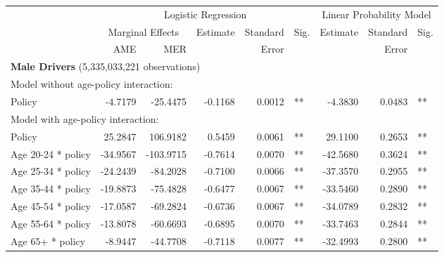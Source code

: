 
\begin{table}%
\centering 
\begin{tabular}{l r r r r l r r l} 

\hline 
 
 & \multicolumn{5}{c}{Logistic Regression}  & \multicolumn{3}{c}{Linear Probability Model} \\ 

 \cmidrule(lr){2-6}\cmidrule(lr){7-9} 
 & \multicolumn{2}{c}{Marginal Effects} & Estimate & Standard & Sig. & Estimate & Standard & Sig. \\ 

 \cmidrule(lr){2-3} 
 &   AME &  MER  &          &  Error   &      &          &  Error   &     \\ 

\hline 
 
\multicolumn{8}{l}{\textbf{Male Drivers} (5,335,033,221 observations)} \\ 

\hline
\multicolumn{8}{l}{Model without age-policy interaction: } \\ 
Policy                   &  -4.7179        &  -25.4475       &  -0.1168        &  0.0012       &   **       &  -4.3830        &  0.0483       &   **       \\ 
\hline
\multicolumn{8}{l}{Model with age-policy interaction: } \\ 
Policy                   &  25.2847        &  106.9182       &  0.5459        &  0.0061       &   **       &  29.1100        &  0.2653       &   **       \\ 
Age 20-24 * policy   &  -34.9567        &  -103.9715       &  -0.7614        &  0.0070       &   **       &  -42.5680        &  0.3624       &   **       \\ 
Age 25-34 * policy   &  -24.2439        &  -84.2028       &  -0.7100        &  0.0066       &   **       &  -37.3570        &  0.2955       &   **       \\ 
Age 35-44 * policy   &  -19.8873        &  -75.4828       &  -0.6477        &  0.0067       &   **       &  -33.5460        &  0.2890       &   **       \\ 
Age 45-54 * policy   &  -17.0587        &  -69.2824       &  -0.6736        &  0.0067       &   **       &  -34.0789        &  0.2832       &   **       \\ 
Age 55-64 * policy   &  -13.8078        &  -60.6693       &  -0.6895        &  0.0070       &   **       &  -33.7463        &  0.2844       &   **       \\ 
Age 65+ * policy   &  -8.9447        &  -44.7708       &  -0.7118        &  0.0077       &   **       &  -32.4993        &  0.2800       &   **       \\ 


\end{tabular}
\end{table}
